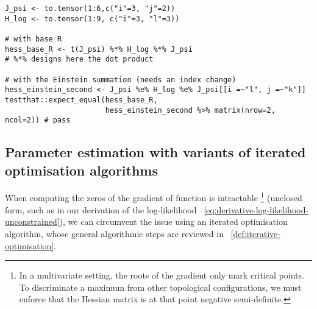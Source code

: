 \documentclass[long, final]{jobim}
\begin{document}
\begin{lstlisting}[caption={Computation of the Second part of the Hessian},label={lst:second-hessian}]
J_psi <- to.tensor(1:6,c("i"=3, "j"=2))
H_log <- to.tensor(1:9, c("i"=3, "l"=3))

# with base R
hess_base_R <- t(J_psi) %*% H_log %*% J_psi
# %*% designs here the dot product

# with the Einstein summation (needs an index change)
hess_einstein_second <- J_psi %e% H_log %e% J_psi[[i =~"l", j =~"k"]]
testthat::expect_equal(hess_base_R,
                       hess_einstein_second %>% matrix(nrow=2, ncol=2)) # pass
\end{lstlisting}

\subsection{Parameter estimation with variants of iterated optimisation algorithms}
\label{subsec:Levenberg–Marquardt}

When computing the zeros of the gradient of function is intractable \footnote{In a multivariate setting, the roots of the gradient only mark critical points. To discriminate a maximum from other topological configurations, we must enforce that the Hessian matrix is at that point negative semi-definite.} (unclosed form, such as in our derivation of the log-likelihood \equationname~\ref{eq:derivative-log-likelihood-unconstrained}), we can circumvent the issue using an iterated optimisation algorithm, whose general algorithmic steps are reviewed in ~\ref{def:iterative-optimisation}.
\end{document}
